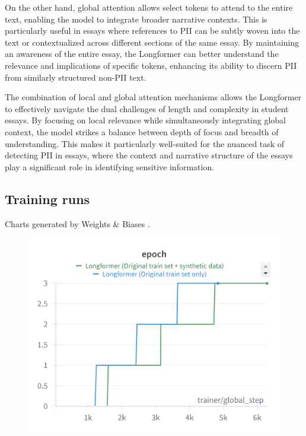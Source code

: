 \documentclass[11pt]{article}
\begin{document}
On the other hand, global attention allows select tokens to attend to the entire text, enabling the model to integrate broader narrative contexts. This is particularly useful in essays where references to PII can be subtly woven into the text or contextualized across different sections of the same essay. By maintaining an awareness of the entire essay, the Longformer can better understand the relevance and implications of specific tokens, enhancing its ability to discern PII from similarly structured non-PII text.

The combination of local and global attention mechanisms allows the Longformer to effectively navigate the dual challenges of length and complexity in student essays. By focusing on local relevance while simultaneously integrating global context, the model strikes a balance between depth of focus and breadth of understanding. This makes it particularly well-suited for the nuanced task of detecting PII in essays, where the context and narrative structure of the essays play a significant role in identifying sensitive information.

\subsection{Training runs}

Charts generated by Weights \& Biases \cite{wandb}.

\begin{figure}[H]
  \centering
  \includegraphics[width=\columnwidth]{images/epochs.png}
  \label{fig:epochs}
\end{figure}
\end{document}

